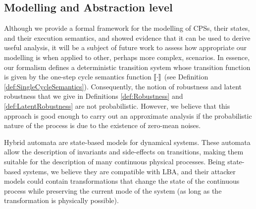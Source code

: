 {{\subsection{Modelling and Abstraction level}
Although we provide a formal framework for the modelling of CPSs, their states, and their execution semantics, and showed evidence that it can be used to derive useful analysis, it will be a subject of future work to assess how appropriate our modelling is when applied to other, perhaps more complex, scenarios. In essence, our formalism defines a deterministic transition system whose transition function is given by the one-step cycle semantics function ${{{\llbracket\cdot\rrbracket}}}$ (see Definition \ref{def:SingleCycleSemantics}). Consequently, the notion of robustness and latent robustness that we give in Definitions \ref{def:Robustness} and \ref{def:LatentRobustness} are not probabilistic. However, we believe that this approach is good enough to carry out an approximate analysis if the probabilistic nature of the process is due to the existence of zero-mean noises. %

{Hybrid automata} \cite{ALUR19953} are state-based models for dynamical systems. These automata allow the description of invariants and side-effects on transitions, making them suitable for the description of many continuous physical processes. Being state-based systems, we believe they are compatible with LBA, and their attacker models could contain transformations that change the state of the continuous process while preserving the current mode of the system (as long as the transformation is physically possible). %


}}
